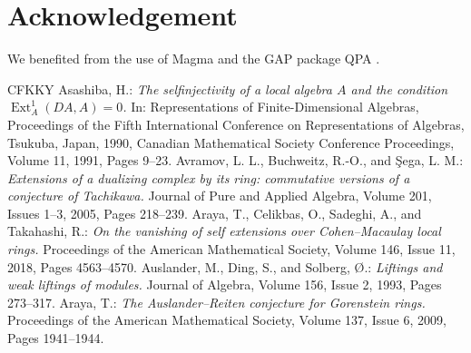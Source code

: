 \documentclass[a4paper]{amsart}
\theoremstyle{definition}
\theoremstyle{remark}
\numberwithin{equation}{section}
\begin{document}
\section*{Acknowledgement}
We benefited from the use of Magma \cite{BCP} and the GAP package QPA \cite{QPA}.


\begin{thebibliography}{CFKKY}
 Asashiba, H.: {\it The selfinjectivity of a local algebra $A$ and the condition $\operatorname{Ext}^1_A(DA,A)=0$.} In: Representations of Finite-Dimensional Algebras, Proceedings of the Fifth International Conference on Representations of Algebras, Tsukuba, Japan, 1990, Canadian Mathematical Society Conference Proceedings, Volume 11, 1991, Pages 9--23.
 Avramov, L. L., Buchweitz, R.-O., and \c{S}ega, L. M.: {\it Extensions of a dualizing complex by its ring: commutative versions of a conjecture of Tachikawa.} Journal of Pure and Applied Algebra, Volume 201, Issues 1--3, 2005, Pages 218--239.
 Araya, T., Celikbas, O., Sadeghi, A., and Takahashi, R.: {\it On the vanishing of self extensions over Cohen--Macaulay local rings.} Proceedings of the American Mathematical Society, Volume 146, Issue 11, 2018, Pages 4563--4570.
 Auslander, M., Ding, S., and Solberg, \O.: {\it Liftings and weak liftings of modules.} Journal of Algebra, Volume 156, Issue 2, 1993, Pages 273--317.
 Araya, T.: {\it The Auslander--Reiten conjecture for Gorenstein rings.} Proceedings of the American Mathematical Society, Volume 137, Issue 6, 2009, Pages 1941--1944.


\end{thebibliography}
\end{document}
